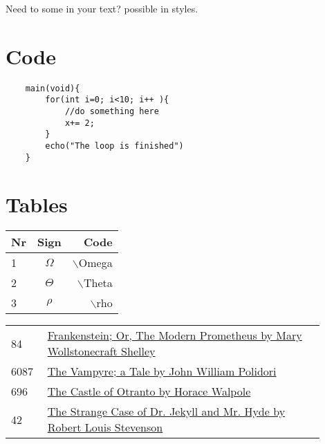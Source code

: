 \documentclass[a4paper]{article}
\begin{document}
\begin{multicols}{3}
    Need to  some  in your text?  possible in  styles.

    \columnbreak

    \section{Code}
    \begin{lstlisting}
    main(void){
        for(int i=0; i<10; i++ ){
            //do something here 
            x+= 2;
        }
        echo("The loop is finished")
    }
    \end{lstlisting}


    \section{Tables}
    \begin{tabular}{l|c|r}
        Nr & Sign     & Code              \\\hline
        1  & $\Omega$ & $\backslash$Omega \\
        2  & $\Theta$ & $\backslash$Theta \\
        3  & $\rho$   & $\backslash$rho
    \end{tabular}

    \begin{tabular}{L{0.1\linewidth}|R{0.8\linewidth}}\scriptsize
        84   & \href{http://www.gutenberg.org/ebooks/84}{Frankenstein; Or, The Modern Prometheus by Mary Wollstonecraft Shelley} \\
        6087 & \href{https://www.gutenberg.org/ebooks/6087}{The Vampyre; a Tale by John William Polidori}                        \\
        696  & \href{https://www.gutenberg.org/ebooks/696}{The Castle of Otranto by Horace Walpole}                              \\
        42   & \href{https://www.gutenberg.org/ebooks/42}{The Strange Case of Dr. Jekyll and Mr. Hyde by Robert Louis Stevenson}
    \end{tabular}

\end{multicols}



\end{document}
